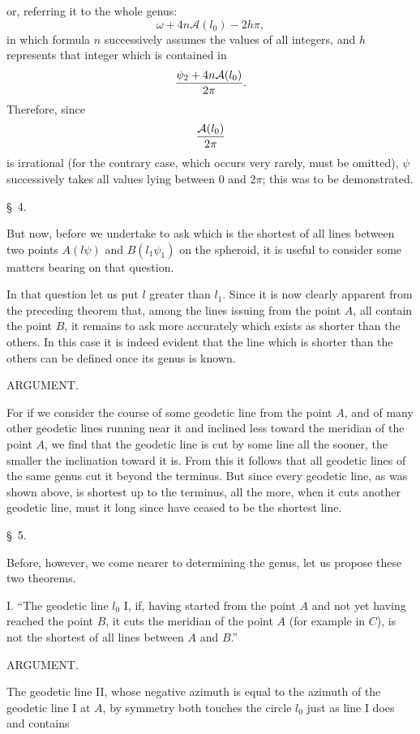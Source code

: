 \begingroup\small
or, referring it to the whole genus:
\[
 \omega+4n\mathcal A(l_0)-2h\pi,
\]
in which formula $n$ successively assumes the values of all integers, and $h$ represents that integer which is contained in
\[
 {\psi_2+4n\mathcal A(l_0)\over 2\pi}.
\]
Therefore, since
\[
 {\mathcal A(l_0)\over 2\pi}
\]
is irrational (for the contrary case, which occurs very rarely, must be omitted), $\psi$ successively takes all values lying between $0$ and $2\pi$; this was to be demonstrated.

\begin{center}\S\ 4.\end{center}

But now, before we undertake to ask which is the shortest of all lines between two points $A(l\psi)$ and $B(l_1\psi_1)$ on the spheroid, it is useful to consider some matters bearing on that question.

In that question let us put $l$ greater than $l_1$. Since it is now clearly apparent from the preceding theorem that, among the lines issuing from the point $A$, all contain the point $B$, it remains to ask more accurately which exists as shorter than the others. In this case it is indeed evident that the line which is shorter than the others can be defined once its genus is known.

\begin{center}ARGUMENT.\end{center}

For if we consider the course of some geodetic line from the point $A$, and of many other geodetic lines running near it and inclined less toward the meridian of the point $A$, we find that the geodetic line is cut by some line all the sooner, the smaller the inclination toward it is. From this it follows that all geodetic lines of the same genus cut it beyond the terminus. But since every geodetic line, as was shown above, is shortest up to the terminus, all the more, when it cuts another geodetic line, must it long since have ceased to be the shortest line.

\begin{center}\S\ 5.\end{center}

Before, however, we come nearer to determining the genus, let us propose these two theorems.

I. ``The geodetic line $l_0$ I, if, having started from the point $A$ and not yet having reached the point $B$, it cuts the meridian of the point $A$ (for example in $C$), is not the shortest of all lines between $A$ and $B$.''

\begin{center}ARGUMENT.\end{center}

The geodetic line II, whose negative azimuth is equal to the azimuth of the geodetic line I at $A$, by symmetry both touches the circle $l_0$ just as line I does and contains
\endgroup
